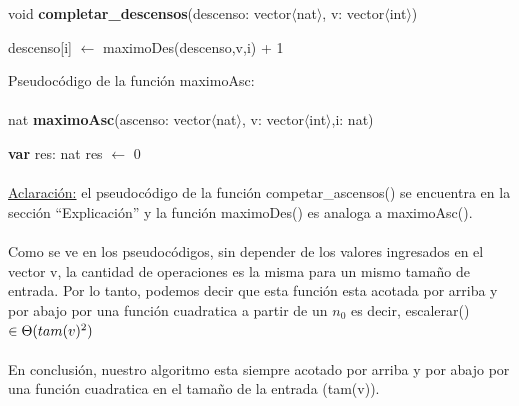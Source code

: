 void \textbf{completar\_descensos}(descenso: vector$\langle$nat$\rangle$, v: vector$\langle$int$\rangle$)\\
	\begin{algorithm}[H]
\BlankLine		
     {descenso[i] $\leftarrow$ maximoDes(descenso,v,i) + 1}
  \end{algorithm}

\vspace*{1cm}
Pseudocódigo de la función maximoAsc:
\\
\\
nat  \textbf{maximoAsc}(ascenso: vector$\langle$nat$\rangle$, v: vector$\langle$int$\rangle$,i: nat)\\
	\begin{algorithm}[H]
	\BlankLine		
      \textbf{var} res: nat 
      res $\leftarrow$ 0 
	\BlankLine		
  \end{algorithm}

\vspace*{1cm}

\paragraph{}
\underline{Aclaración:} el pseudocódigo de la función competar\_ascensos() se encuentra en la sección ``Explicación'' y la función maximoDes() es analoga a maximoAsc().

\paragraph{}
Como se ve en los pseudocódigos, sin depender de los valores ingresados en el vector v, la cantidad de operaciones es la misma para un mismo tamaño de entrada. Por lo tanto, podemos decir que esta función esta acotada por arriba y por abajo por una función cuadratica a partir de un $n_0$ es decir, escalerar() $\in \Theta(tam(v)^2)$

\paragraph{}
En conclusión, nuestro algoritmo esta siempre acotado por arriba y por abajo por una función cuadratica en el tamaño de la entrada (tam(v)).



